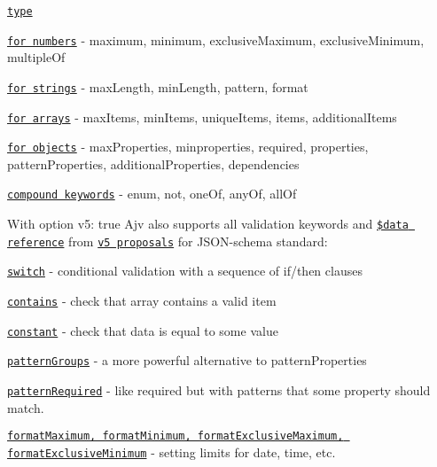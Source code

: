 \begin{DoxyItemize}
\item \href{https://github.com/epoberezkin/ajv/blob/master/KEYWORDS.md#type}{\tt type}
\item \href{https://github.com/epoberezkin/ajv/blob/master/KEYWORDS.md#keywords-for-numbers}{\tt for numbers} -\/ maximum, minimum, exclusive\+Maximum, exclusive\+Minimum, multiple\+Of
\item \href{https://github.com/epoberezkin/ajv/blob/master/KEYWORDS.md#keywords-for-strings}{\tt for strings} -\/ max\+Length, min\+Length, pattern, format
\item \href{https://github.com/epoberezkin/ajv/blob/master/KEYWORDS.md#keywords-for-arrays}{\tt for arrays} -\/ max\+Items, min\+Items, unique\+Items, items, additional\+Items
\item \href{https://github.com/epoberezkin/ajv/blob/master/KEYWORDS.md#keywords-for-objects}{\tt for objects} -\/ max\+Properties, minproperties, required, properties, pattern\+Properties, additional\+Properties, dependencies
\item \href{https://github.com/epoberezkin/ajv/blob/master/KEYWORDS.md#keywords-for-all-types}{\tt compound keywords} -\/ enum, not, one\+Of, any\+Of, all\+Of
\end{DoxyItemize}

With option {\ttfamily v5\+: true} Ajv also supports all validation keywords and \href{#data-reference}{\tt \$data reference} from \href{https://github.com/json-schema/json-schema/wiki/v5-Proposals}{\tt v5 proposals} for J\+S\+O\+N-\/schema standard\+:


\begin{DoxyItemize}
\item \href{https://github.com/epoberezkin/ajv/blob/master/KEYWORDS.md#switch-v5-proposal}{\tt switch} -\/ conditional validation with a sequence of if/then clauses
\item \href{https://github.com/epoberezkin/ajv/blob/master/KEYWORDS.md#contains-v5-proposal}{\tt contains} -\/ check that array contains a valid item
\item \href{https://github.com/epoberezkin/ajv/blob/master/KEYWORDS.md#constant-v5-proposal}{\tt constant} -\/ check that data is equal to some value
\item \href{https://github.com/epoberezkin/ajv/blob/master/KEYWORDS.md#patterngroups-v5-proposal}{\tt pattern\+Groups} -\/ a more powerful alternative to pattern\+Properties
\item \href{https://github.com/epoberezkin/ajv/blob/master/KEYWORDS.md#patternrequired-v5-proposal}{\tt pattern\+Required} -\/ like {\ttfamily required} but with patterns that some property should match.
\item \href{https://github.com/epoberezkin/ajv/blob/master/KEYWORDS.md#formatmaximum--formatminimum-and-exclusiveformatmaximum--exclusiveformatminimum-v5-proposal}{\tt format\+Maximum, format\+Minimum, format\+Exclusive\+Maximum, format\+Exclusive\+Minimum} -\/ setting limits for date, time, etc.
\end{DoxyItemize}

